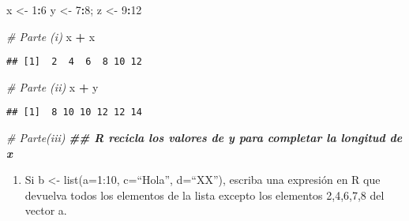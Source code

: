 \documentclass[
]{article}
\newenvironment{Shaded}{\begin{snugshade}}{\end{snugshade}}
\newcommand{\AttributeTok}[1]{\textcolor[rgb]{0.13,0.29,0.53}{#1}}
\newcommand{\CommentTok}[1]{\textcolor[rgb]{0.56,0.35,0.01}{\textit{#1}}}
\newcommand{\DecValTok}[1]{\textcolor[rgb]{0.00,0.00,0.81}{#1}}
\newcommand{\DocumentationTok}[1]{\textcolor[rgb]{0.56,0.35,0.01}{\textbf{\textit{#1}}}}
\newcommand{\FunctionTok}[1]{\textcolor[rgb]{0.13,0.29,0.53}{\textbf{#1}}}
\newcommand{\NormalTok}[1]{#1}
\newcommand{\OtherTok}[1]{\textcolor[rgb]{0.56,0.35,0.01}{#1}}
\newcommand{\SpecialCharTok}[1]{\textcolor[rgb]{0.81,0.36,0.00}{\textbf{#1}}}
\newcommand{\StringTok}[1]{\textcolor[rgb]{0.31,0.60,0.02}{#1}}
\providecommand{\tightlist}{%
  \setlength{\itemsep}{0pt}\setlength{\parskip}{0pt}}
\begin{document}
\begin{Shaded}
\begin{Highlighting}[]
\NormalTok{x }\OtherTok{\textless{}{-}} \DecValTok{1}\SpecialCharTok{:}\DecValTok{6}
\NormalTok{y }\OtherTok{\textless{}{-}} \DecValTok{7}\SpecialCharTok{:}\DecValTok{8}\NormalTok{; z }\OtherTok{\textless{}{-}} \DecValTok{9}\SpecialCharTok{:}\DecValTok{12}

\CommentTok{\# Parte (i)}
\NormalTok{x }\SpecialCharTok{+}\NormalTok{ x}
\end{Highlighting}
\end{Shaded}

\begin{verbatim}
## [1]  2  4  6  8 10 12
\end{verbatim}

\begin{Shaded}
\begin{Highlighting}[]
\CommentTok{\# Parte (ii)}
\NormalTok{x }\SpecialCharTok{+}\NormalTok{ y}
\end{Highlighting}
\end{Shaded}

\begin{verbatim}
## [1]  8 10 10 12 12 14
\end{verbatim}

\begin{Shaded}
\begin{Highlighting}[]
\CommentTok{\# Parte(iii)}
\DocumentationTok{\#\# R recicla los valores de \textquotesingle{}y\textquotesingle{} para completar la longitud de \textquotesingle{}x\textquotesingle{}}
\end{Highlighting}
\end{Shaded}

\begin{enumerate}
\def\labelenumi{\arabic{enumi}.}
\setcounter{enumi}{3}
\tightlist
\item
  Si b \textless- list(a=1:10, c=``Hola'', d=``XX''), escriba una
  expresión en R que devuelva todos los elementos de la lista excepto
  los elementos 2,4,6,7,8 del vector a.
\end{enumerate}

\begin{Shaded}
\end{Shaded}
\end{document}
